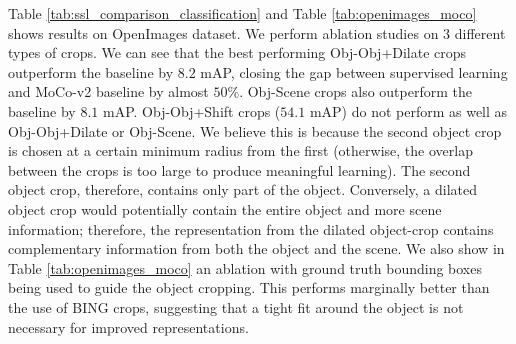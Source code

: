 Table \ref{tab:ssl_comparison_classification} and Table \ref{tab:openimages_moco} shows results on OpenImages dataset. We perform ablation studies on $3$ different types of crops. We can see that the best performing Obj-Obj+Dilate crops outperform the baseline by $8.2$ mAP, closing the gap between supervised learning and MoCo-v2 baseline by almost $50\%$. Obj-Scene crops also outperform the baseline by $8.1$ mAP.  Obj-Obj+Shift crops ($54.1$ mAP) do not perform as well as Obj-Obj+Dilate or Obj-Scene. We believe this is because the second object crop is chosen at a certain minimum radius from the first (otherwise, the overlap between the crops is too large to produce meaningful learning). The second object crop, therefore, contains only part of the object. Conversely, a dilated object crop would potentially contain the entire object and more scene information; therefore, the representation from the dilated object-crop contains complementary information from both the object and the scene. 
We also show in Table \ref{tab:openimages_moco} an ablation with ground truth bounding boxes being used to guide the object cropping. This performs marginally better than the use of BING crops, suggesting that a tight fit around the object is not necessary for improved representations. 





